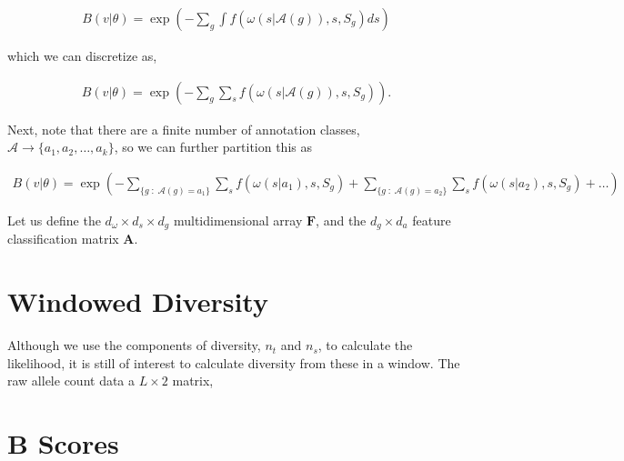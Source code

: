 \documentclass[11pt]{article}
\begin{document}
\begin{align}
  B(v | \theta) = \exp\left(- \sum_g \int f(\omega(s|\mathcal{A}(g)), s, S_g) ds \right)
\end{align}


which we can discretize as,

\begin{align}
  B(v | \theta) = \exp\left(- \sum_g \sum_s f(\omega(s|\mathcal{A}(g)), s, S_g) \right).
\end{align}

Next, note that there are a finite number of annotation classes, $\mathcal{A}
\to \{a_1, a_2, \ldots, a_k\}$, so we can further partition this as

\begin{align}
  B(v | \theta) = \exp\left(- \sum_{\{g \;:\; \mathcal{A}(g) = a_1\}} \sum_s f(\omega(s| a_1), s, S_g) + \sum_{\{g \;:\; \mathcal{A}(g) = a_2\}} \sum_s f(\omega(s| a_2), s, S_g) + \ldots  \right)
\end{align}

Let us define the $d_\omega \times d_s \times d_g$ multidimensional array
$\mathbf{F}$, and the $d_g \times d_a$ feature classification matrix
$\mathbf{A}$.




\section*{Windowed Diversity}

Although we use the components of diversity, $n_t$ and $n_s$, to calculate the
likelihood, it is still of interest to calculate diversity from these in a
window. The raw allele count data a $L \times \text{2}$ matrix, 

\section{B Scores}
\end{document}
